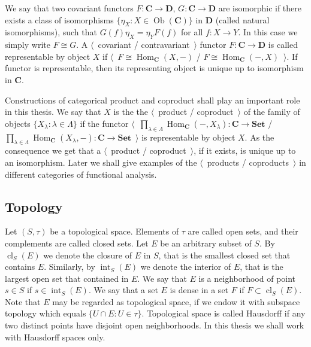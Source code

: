 We say that two covariant functors $F:\mathbf{C}\to\mathbf{D}$, $G:\mathbf{C}\to\mathbf{D}$ are isomorphic if there exists a class of isomorphisms $\{\eta_X:X\in\operatorname{Ob}(\mathbf{C})\}$ in $\mathbf{D}$ (called natural isomorphisms), such that $G(f)\eta_X=\eta_Y F(f)$ for all $f:X\to Y$. In this case we simply write $F\cong G$. A $\langle$~covariant / contravariant~$\rangle$ functor $F:\mathbf{C}\to\mathbf{D}$ is called representable by object $X$ if $\langle$~$F\cong\operatorname{Hom}_{\mathbf{C}}(X,-)$ / $F\cong\operatorname{Hom}_{\mathbf{C}}(-,X)$~$\rangle$. If functor is representable, then its representing object is unique up to isomorphism in $\mathbf{C}$.

Constructions of categorical product and coproduct shall play an important role in this thesis. We say that $X$ is the the $\langle$~product / coproduct~$\rangle$ of the family of objects $\{X_\lambda:\lambda\in\Lambda\}$ if the functor $\langle$~$\prod_{\lambda\in\Lambda}\operatorname{Hom}_{\mathbf{C}}(-,X_{\lambda}):\mathbf{C}\to\mathbf{Set}$ / $\prod_{\lambda\in\Lambda}\operatorname{Hom}_{\mathbf{C}}(X_{\lambda},-):\mathbf{C}\to\mathbf{Set}$~$\rangle$ is representable by object $X$. As the consequence we get that a $\langle$~product / coproduct~$\rangle$, if it exists, is unique up to an isomorphism. Later we shall give examples of the $\langle$~products / coproducts~$\rangle$ in different categories of functional analysis. 



\subsection{Topology}
\label{SubSectionTopology}

Let $(S,\tau)$ be a topological space. Elements of $\tau$ are called open sets, and their complements are called closed sets. Let $E$ be an arbitrary subset of $S$. By $\operatorname{cl}_S(E)$ we denote the closure of $E$ in $S$, that is the smallest closed set that contains $E$. Similarly, by $\operatorname{int}_S(E)$ we denote the interior of $E$, that is the largest open set that contained in $E$. We say that $E$ is a neighborhood of point $s\in S$ if $s\in \operatorname{int}_S(E)$. We say that a set $E$ is dense in a set $F$ if $F\subset\operatorname{cl}_S(E)$. Note that $E$ may be regarded as topological space, if we endow it with subspace topology which equals $\{U\cap E:U\in\tau\}$. Topological space is called Hausdorff if any two distinct points have disjoint open neighborhoods. In this thesis we shall work with Hausdorff spaces only.

